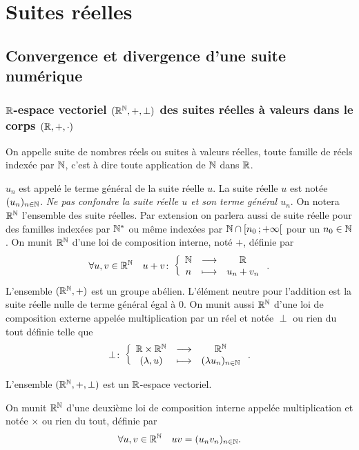 \chapter{Suites  réelles}
\label{chap:suites}
\minitoc
\minilof
\minilot
\section{Convergence et divergence d'une suite numérique}

\subsection{\(\mathbb{R}\)-espace vectoriel \((\mathbb{R}^{\mathbb{N}},+,\perp)\) des suites réelles à valeurs dans le corps \((\mathbb{R},+,\cdot)\)}

\begin{defdef}
  On appelle suite de nombres réels ou suites à valeurs réelles, toute famille de réels indexée par \(\mathbb{N}\), c'est à dire toute application de \(\mathbb{N}\) dans \(\mathbb{R}\).
\end{defdef}
\(u_n\) est appelé le terme général de la suite réelle \(u\). La suite réelle \(u\) est notée \((u_n)_{n\in\mathbb{N}}\). \emph{Ne pas confondre la suite réelle \(u\) et son terme général \(u_n\)}. On notera \(\mathbb{R}^{\mathbb{N}}\) l'ensemble des suite réelles. Par extension on parlera aussi de suite réelle pour des familles indexées par \(\mathbb{N}^*\) ou même indexées par \(\mathbb{N} \cap \left[ n_0 \, ;  +\infty \right[\) pour un \(n_0 \in \mathbb{N}\). On munit \(\mathbb{R}^{\mathbb{N}}\) d'une loi de composition interne, noté \(+\), définie par
\begin{equation}
  \forall u,v \in \mathbb{R}^{\mathbb{N}} \quad u+v\colon \left\{\begin{array}{ccc} \mathbb{N} & \longrightarrow &\mathbb{R}\\ n & \longmapsto & u_n+v_n \end{array} \right..
\end{equation}
L'ensemble \((\mathbb{R}^{\mathbb{N}},+)\) est un groupe abélien. L'élément neutre pour l'addition est la suite réelle nulle de terme général égal à \(0\). On munit aussi \(\mathbb{R}^{\mathbb{N}}\) d'une loi de composition externe appelée multiplication par un réel et notée \(\perp\) ou rien du tout définie telle que
\begin{equation}
  \perp\colon \left\{\begin{array}{ccc} \mathbb{R}\times\mathbb{R}^{\mathbb{N}} & \longrightarrow &\mathbb{R}^{\mathbb{N}}\\ (\lambda,u) & \longmapsto & (\lambda u_n)_{n\in\mathbb{N}} \end{array} \right..
\end{equation}
\begin{prop}
  L'ensemble \((\mathbb{R}^{\mathbb{N}},+,\perp)\) est un \(\mathbb{R}\)-espace vectoriel.
\end{prop}
On munit \(\mathbb{R}^{\mathbb{N}}\) d'une deuxième loi de composition interne appelée multiplication et notée \(\times\) ou rien du tout, définie par
\begin{equation}
  \forall u,v \in \mathbb{R}^{\mathbb{N}} \quad uv=(u_nv_n)_{n\in \mathbb{N}}.
\end{equation}
